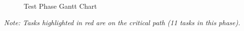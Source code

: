 \begin{figure}[H]
{\begin{ganttchart}

\end{ganttchart}
}%
\caption{Test Phase Gantt Chart}
\label{fig:gantt_test}
\end{figure}

\noindent\textit{Note: Tasks highlighted in red are on the critical path (11 tasks in this phase).}
